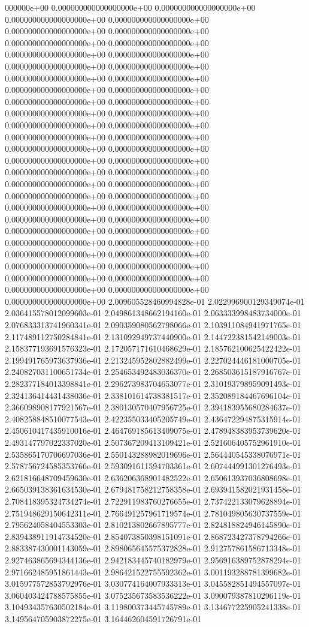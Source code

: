000000e+00	0.000000000000000000e+00	0.000000000000000000e+00	0.000000000000000000e+00	0.000000000000000000e+00	0.000000000000000000e+00	0.000000000000000000e+00	0.000000000000000000e+00	0.000000000000000000e+00	0.000000000000000000e+00	0.000000000000000000e+00	0.000000000000000000e+00	0.000000000000000000e+00	0.000000000000000000e+00	0.000000000000000000e+00	0.000000000000000000e+00	0.000000000000000000e+00	0.000000000000000000e+00	0.000000000000000000e+00	0.000000000000000000e+00	0.000000000000000000e+00	0.000000000000000000e+00	0.000000000000000000e+00	0.000000000000000000e+00	0.000000000000000000e+00	0.000000000000000000e+00	0.000000000000000000e+00	0.000000000000000000e+00	0.000000000000000000e+00	0.000000000000000000e+00	0.000000000000000000e+00	0.000000000000000000e+00	0.000000000000000000e+00	0.000000000000000000e+00	0.000000000000000000e+00	0.000000000000000000e+00	0.000000000000000000e+00	0.000000000000000000e+00	0.000000000000000000e+00	0.000000000000000000e+00	0.000000000000000000e+00	0.000000000000000000e+00	0.000000000000000000e+00	0.000000000000000000e+00	0.000000000000000000e+00	0.000000000000000000e+00	0.000000000000000000e+00	0.000000000000000000e+00	0.000000000000000000e+00	0.000000000000000000e+00	0.000000000000000000e+00	0.000000000000000000e+00	2.009605528460994828e-01	2.022996900129349074e-01	2.036415578012099603e-01	2.049861348662194160e-01	2.063333998483734000e-01	2.076833313741960341e-01	2.090359080562798066e-01	2.103911084941971765e-01	2.117489112750284841e-01	2.131092949737440900e-01	2.144722381542149003e-01	2.158377193691576323e-01	2.172057171610468629e-01	2.185762100625422422e-01	2.199491765973637936e-01	2.213245952802882499e-01	2.227024446181000705e-01	2.240827031100651734e-01	2.254653492483036370e-01	2.268503615187916767e-01	2.282377184013398841e-01	2.296273983704653077e-01	2.310193798959091493e-01	2.324136414431438036e-01	2.338101614738381517e-01	2.352089184467696104e-01	2.366098908177921567e-01	2.380130570407956725e-01	2.394183955680284637e-01	2.408258848510077543e-01	2.422355033405205749e-01	2.436472294875315914e-01	2.450610417435910016e-01	2.464769185613409075e-01	2.478948383953739620e-01	2.493147797022337020e-01	2.507367209413109421e-01	2.521606405752961910e-01	2.535865170706697036e-01	2.550143288982019696e-01	2.564440545338076971e-01	2.578756724585353766e-01	2.593091611594703361e-01	2.607444991301276493e-01	2.621816648709459630e-01	2.636206368901482522e-01	2.650613937036808698e-01	2.665039138361634530e-01	2.679481758212758358e-01	2.693941582021931458e-01	2.708418395324734274e-01	2.722911983760276655e-01	2.737422133079628894e-01	2.751948629150642311e-01	2.766491257961719574e-01	2.781049805630737559e-01	2.795624058404553303e-01	2.810213802667895777e-01	2.824818824946145890e-01	2.839438911914734520e-01	2.854073850398151091e-01	2.868723427378794266e-01	2.883387430001143059e-01	2.898065645575372828e-01	2.912757861586713348e-01	2.927463865694344136e-01	2.942183445740182979e-01	2.956916389752878294e-01	2.971662485951861443e-01	2.986421522755592362e-01	3.001193288781399682e-01	3.015977572853792976e-01	3.030774164007933313e-01	3.045582851494557097e-01	3.060403424788575855e-01	3.075235673583536222e-01	3.090079387810296119e-01	3.104934357630502184e-01	3.119800373445745789e-01	3.134677225905241338e-01	3.149564705903872275e-01	3.164462604591726791e-01	